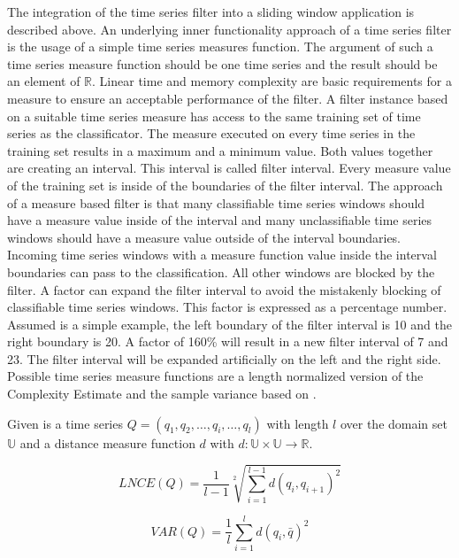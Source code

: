 The integration of the time series filter into a sliding window application is described above. An underlying inner
functionality approach of a time series filter is the usage of a simple time series measures function. The argument of
such a time series measure function should be one time series and the result should be an element of $\mathbb{R}$.
Linear time and memory complexity are basic requirements for a measure to ensure an acceptable performance of the
filter. A filter instance based on a suitable time series measure has access to the same training set of time series as
the classificator. The measure executed on every time series in the training set results in a maximum and a minimum
value. Both values together are creating an interval. This interval is called filter interval. Every measure value of the
training set is inside of the boundaries of the filter interval. The approach of a measure based filter is that many
classifiable time series windows should have a measure value inside of the interval and many unclassifiable time series
windows should have a measure value outside of the interval boundaries. Incoming time series windows with a measure
function value inside the interval boundaries can pass to the classification. All other windows are blocked by the
filter. A factor can expand the filter interval to avoid the mistakenly blocking of classifiable time series windows.
This factor is expressed as a percentage number. Assumed is a simple example, the left
boundary of the filter interval is 10 and the right boundary is 20. A factor of 160\% will result in a new filter
interval of 7 and 23. The filter interval will be expanded artificially on the left and the right side. Possible time
series measure functions are a length normalized version of the Complexity Estimate \cite{batista2011complexity} and the
sample variance based on \cite{chan1983algorithms}.

Given is a time series $Q = (q_1, q_2, \dots, q_i, \dots, q_l)$
with length $l$ over the domain set $\mathbb{U}$ and a distance measure function $d$ with
$d: \mathbb{U} \times \mathbb{U} \to \mathbb{R}$.

\begin{equation}
    LNCE(Q) = \frac{1}{l-1}\sqrt[2]{\sum \limits_{i=1}^{l-1} d(q_i, q_{i + 1})^2}
\end{equation}

\begin{equation}
    VAR(Q) = \frac{1}{l}\sum \limits_{i=1}^{l} d(q_i, \bar{q})^2
\end{equation}
